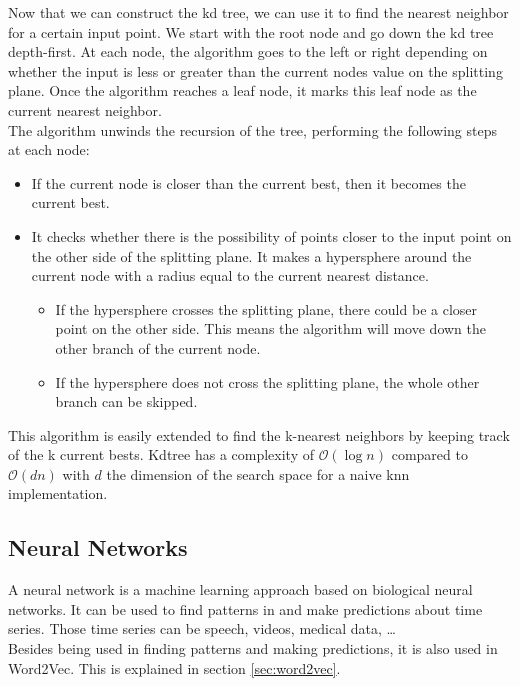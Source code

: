 Now that we can construct the kd tree, we can use it to find the nearest neighbor for a certain input point. We start with the root node and go down the kd tree depth-first. At each node, the algorithm goes to the left or right depending on whether the input is less or greater than the current nodes value on the splitting plane. Once the algorithm reaches a leaf node, it marks this leaf node as the current nearest neighbor. \\
The algorithm unwinds the recursion of the tree, performing the following steps at each node:
\begin{itemize}

\item If the current node is closer than the current best, then it becomes the current best.
\item It checks whether there is the possibility of points closer to the input point on the other side of the splitting plane. It makes a hypersphere around the current node with a radius equal to the current nearest distance. 
\begin{itemize}
\item If the hypersphere crosses the splitting plane, there could be a closer point on the other side. This means the algorithm will move down the other branch of the current node.
\item If the hypersphere does not cross the splitting plane, the whole other branch can be skipped.
\end{itemize}
\end{itemize}

This algorithm is easily extended to find the k-nearest neighbors by keeping track of the k current bests. Kdtree has a complexity of $\mathcal{O}(\log{}n)$ compared to $\mathcal{O}(dn)$ with $d$ the dimension of the search space for a naive knn implementation.
	
	\subsection{Neural Networks}
	
A neural network is a machine learning approach based on biological neural networks. It can be used to find patterns in and make predictions about time series. Those time series can be speech, videos, medical data, \ldots \\
Besides being used in finding patterns and making predictions, it is also used in Word2Vec. This is explained in section \ref{sec:word2vec}.


